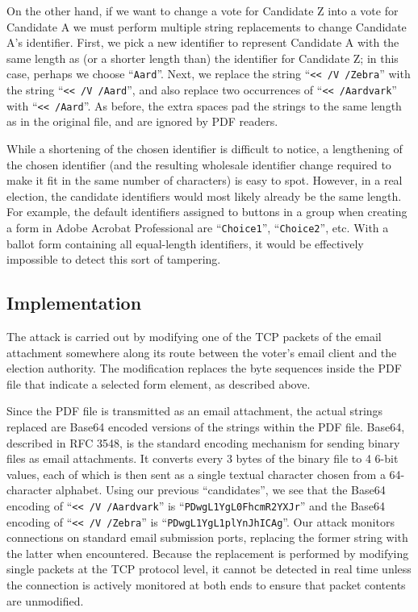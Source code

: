 \documentclass{article}
\newcommand{\etc}{etc.\xspace}
\begin{document}
On the other hand, if we want to change a vote for Candidate Z into a
vote for Candidate A we must perform multiple string replacements to
change Candidate A's identifier.  First, we pick a new identifier to
represent Candidate A with the same length as (or a shorter length
than) the identifier for Candidate Z; in this case, perhaps we choose
``\texttt{Aard}''. Next, we replace the string ``\texttt{<{}< /V
  /Zebra}'' with the string ``\texttt{<{}< /V
  /Aard\textvisiblespace}'', and also replace two occurrences of
``\texttt{<{}< /Aardvark}'' with ``\texttt{<{}<
  /Aard\textvisiblespace\textvisiblespace\textvisiblespace\textvisiblespace}''. As
before, the extra spaces pad the strings to the same length as in the
original file, and are ignored by PDF readers.

While a shortening of the chosen identifier is difficult to notice, a
lengthening of the chosen identifier (and the resulting wholesale
identifier change required to make it fit in the same number of
characters) is easy to spot. However, in a real election, the
candidate identifiers would most likely already be the same
length. For example, the default identifiers assigned to buttons in a
group when creating a form in Adobe Acrobat Professional are
``\texttt{Choice1}'', ``\texttt{Choice2}'', \etc With a ballot form
containing all equal-length identifiers, it would be effectively
impossible to detect this sort of tampering.

\subsection{Implementation}

The attack is carried out by modifying one of the TCP packets of the
email attachment somewhere along its route between the voter's email
client and the election authority. The modification replaces the byte
sequences inside the PDF file that indicate a selected form element,
as described above.

Since the PDF file is transmitted as an email attachment, the actual
strings replaced are Base64 encoded versions of the strings within the
PDF file. Base64, described in RFC 3548, is the standard encoding
mechanism for sending binary files as email attachments. It converts
every 3 bytes of the binary file to 4 6-bit values, each of which is
then sent as a single textual character chosen from a 64-character
alphabet. Using our previous ``candidates'', we see that the Base64
encoding of ``\texttt{<{}< /V /Aardvark}'' is
``\texttt{PDwgL1YgL0FhcmR2YXJr}'' and the Base64 encoding of
``\texttt{<{}< /V
  /Zebra\textvisiblespace\textvisiblespace\textvisiblespace}'' is
``\texttt{PDwgL1YgL1plYnJhICAg}''. Our attack monitors connections on
standard email submission ports, replacing the former string with the
latter when encountered. Because the replacement is performed by
modifying single packets at the TCP protocol level, it cannot be
detected in real time unless the connection is actively monitored at
both ends to ensure that packet contents are unmodified.
\end{document}
